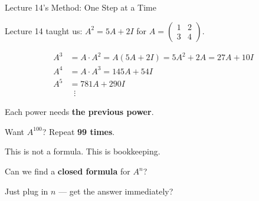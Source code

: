\documentclass[10pt]{beamer}
\theoremstyle{definition}
\newcommand{\x}[1]{\alert{\textbf{#1}}}
\begin{document}
%
\begin{frame}{Lecture 14's Method: One Step at a Time}

Lecture 14 taught us: $A^2 = 5A + 2I$ for $A = \begin{pmatrix}1&2\\3&4\end{pmatrix}$.

\vfill

\begin{align*}
A^3 &= A \cdot A^2 = A(5A + 2I) = 5A^2 + 2A = 27A + 10I \\
A^4 &= A \cdot A^3 = 145A + 54I \\
A^5 &= 781A + 290I \\
     &\;\;\vdots
\end{align*}

\vfill\pause

Each power needs \x{the previous power}.

\vfill

Want $A^{100}$? \quad Repeat \x{99 times}.

\vfill

This is not a formula. This is bookkeeping.

\end{frame}


\begin{frame}{}

\vfill

\begin{center}
{\Large Can we find a \x{closed formula} for $A^n$?}

\vspace{1cm}

{\large Just plug in $n$ --- get the answer immediately?}
\end{center}

\vfill

\end{frame}
\end{document}
